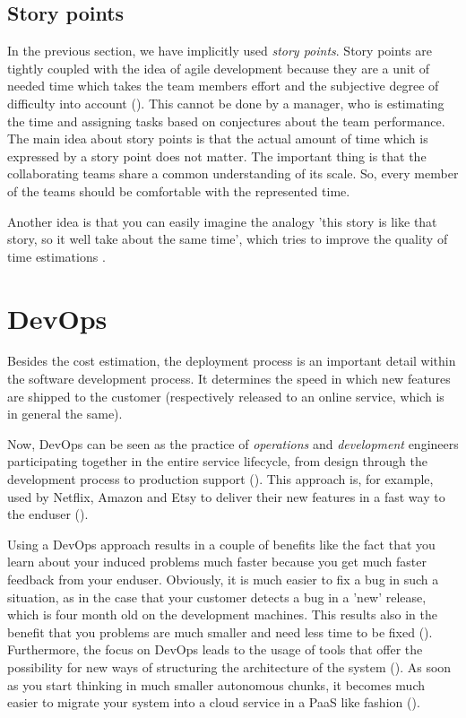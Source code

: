 \subsection{Story points}
\label{storyPoints}
In the previous section, we have implicitly used \emph{story points}. Story points are tightly coupled with the idea of agile development because they are a unit of needed time which takes the team members effort and the subjective degree of difficulty into account (\cite{ScrumMeth}). This cannot be done by a manager, who is estimating the time and assigning tasks based on conjectures about the team performance. The main idea about story points is that the actual amount of time which is expressed by a story point does not matter. The important thing is that the collaborating teams share a common understanding of its scale. So, every member of the teams should be comfortable with the represented time. 

Another idea is that you can easily imagine the analogy 'this story is like that story, so it well take about the same time', which tries to improve the quality of time estimations \cite{cohn2004user}.

\section{DevOps}
Besides the cost estimation, the deployment process is an important detail within the software development process. It determines the speed in which new features are shipped to the customer (respectively released to an online service, which is in general the same).

Now, DevOps can be seen as the practice of \emph{operations} and \emph{development} engineers participating together in the entire service lifecycle, from design through the development process to production support (\cite{Mueller2011}). This approach is, for example, used by Netflix, Amazon and Etsy to deliver their new features in a fast way to the enduser (\cite{duvall2012breaking}).

Using a DevOps approach results in a couple of benefits like the fact that you learn about your induced problems much faster because you get much faster feedback from your enduser. Obviously, it is much easier to fix a bug in such a situation, as in the case that your customer detects a bug in a 'new' release, which is four month old on the development machines. This results also in the benefit that you problems are much smaller and need less time to be fixed (\cite{duvall2012breaking}).
Furthermore, the focus on DevOps leads to the usage of tools that offer the possibility for new ways of structuring the architecture of the system (\cite{cukier2013devops}). As soon as you start thinking in much smaller autonomous chunks, it becomes much easier to migrate your system into a cloud service in a \ac{PaaS} like fashion (\cite{cukier2013devops}). 

